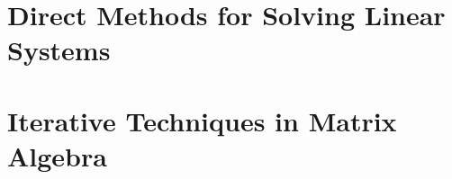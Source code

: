\documentclass[openany]{ctexbook}
\begin{document}
\chapter{Direct Methods for Solving Linear Systems}
  
  

\chapter{Iterative Techniques in Matrix Algebra}
  
  
  
  

\end{document}
